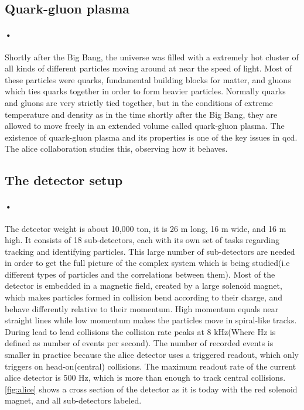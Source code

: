 \documentclass[a4paper, 12pt]{report}
\begin{document}
\subsection{Quark-gluon plasma}
\paragraph{•}
Shortly after the Big Bang, the universe was filled with a extremely hot cluster of all kinds of different particles moving around at near the speed of light\cite{alice-physics}.
Most of these particles were quarks, fundamental building blocks for matter, and gluons which ties quarks together in order to form heavier particles.
Normally quarks and gluons are very strictly tied together, but in the conditions of extreme temperature and density as in the time shortly after the Big Bang, they are allowed to move freely in an extended volume called quark-gluon plasma.
The existence of quark-gluon plasma and its properties is one of the key issues in \gls{qcd}.
The \gls{alice} collaboration studies this, observing how it behaves.

\subsection{The detector setup}
\paragraph{•}
The detector weight is about 10,000 ton, it is 26 m long, 16 m wide, and 16 m high\cite{alice-about}.
It consists of 18 sub-detectors, each with its own set of tasks regarding tracking and identifying particles.
This large number of sub-detectors are needed in order to get the full picture of the complex system which is being studied(i.e different types of particles and the correlations between them).
Most of the detector is embedded in a magnetic field, created by a large solenoid magnet, which makes particles formed in collision bend according to their charge, and behave differently relative to their momentum. High momentum equals near straight lines while low momentum makes the particles move in spiral-like tracks.
During lead to lead collisions the collision rate peaks at 8 kHz(Where Hz is defined as number of events per second).
The number of recorded events is smaller in practice because the \gls{alice} detector uses a triggered readout, which only triggers on head-on(central) collisions.
The maximum readout rate of the current \gls{alice} detector is 500 Hz, which is more than enough to track central collisions.
\ref{fig:alice} shows a cross section of the detector as it is today with the red solenoid magnet, and all sub-detectors labeled.
\end{document}
